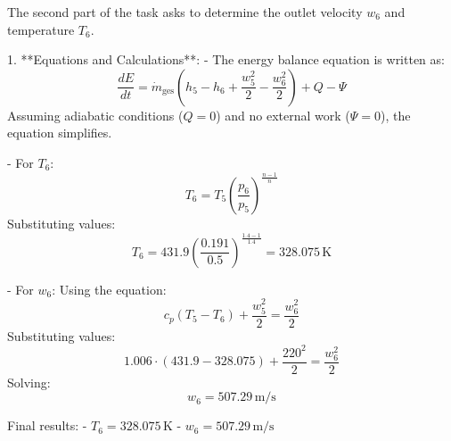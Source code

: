 The second part of the task asks to determine the outlet velocity \( w_6 \) and temperature \( T_6 \).  

1. **Equations and Calculations**:  
   - The energy balance equation is written as:  
     \[
     \frac{dE}{dt} = \dot{m}_{\text{ges}} \left( h_5 - h_6 + \frac{w_5^2}{2} - \frac{w_6^2}{2} \right) + Q - \Psi
     \]  
     Assuming adiabatic conditions (\( Q = 0 \)) and no external work (\( \Psi = 0 \)), the equation simplifies.  

   - For \( T_6 \):  
     \[
     T_6 = T_5 \left( \frac{p_6}{p_5} \right)^{\frac{n-1}{n}}
     \]  
     Substituting values:  
     \[
     T_6 = 431.9 \left( \frac{0.191}{0.5} \right)^{\frac{1.4-1}{1.4}} = 328.075 \, \text{K}
     \]  

   - For \( w_6 \):  
     Using the equation:  
     \[
     c_p(T_5 - T_6) + \frac{w_5^2}{2} = \frac{w_6^2}{2}
     \]  
     Substituting values:  
     \[
     1.006 \cdot (431.9 - 328.075) + \frac{220^2}{2} = \frac{w_6^2}{2}
     \]  
     Solving:  
     \[
     w_6 = 507.29 \, \text{m/s}
     \]  

Final results:  
- \( T_6 = 328.075 \, \text{K} \)  
- \( w_6 = 507.29 \, \text{m/s} \)